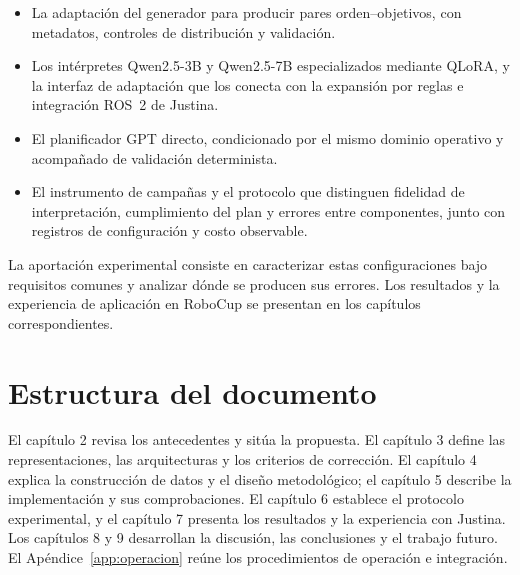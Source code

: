 \begin{itemize}
    \item La adaptación del generador para producir pares orden--objetivos, con metadatos, controles de distribución y validación.
    \item Los intérpretes Qwen2.5-3B y Qwen2.5-7B especializados mediante QLoRA, y la interfaz de adaptación que los conecta con la expansión por reglas e integración ROS~2 de Justina.
    \item El planificador GPT directo, condicionado por el mismo dominio operativo y acompañado de validación determinista.
    \item El instrumento de campañas y el protocolo que distinguen fidelidad de interpretación, cumplimiento del plan y errores entre componentes, junto con registros de configuración y costo observable.
\end{itemize}

La aportación experimental consiste en caracterizar estas configuraciones bajo requisitos comunes y analizar dónde se producen sus errores. Los resultados y la experiencia de aplicación en RoboCup se presentan en los capítulos correspondientes.

\section{Estructura del documento}

El capítulo 2 revisa los antecedentes y sitúa la propuesta. El capítulo 3 define las representaciones, las arquitecturas y los criterios de corrección. El capítulo 4 explica la construcción de datos y el diseño metodológico; el capítulo 5 describe la implementación y sus comprobaciones. El capítulo 6 establece el protocolo experimental, y el capítulo 7 presenta los resultados y la experiencia con Justina. Los capítulos 8 y 9 desarrollan la discusión, las conclusiones y el trabajo futuro. El Apéndice~\ref{app:operacion} reúne los procedimientos de operación e integración.

